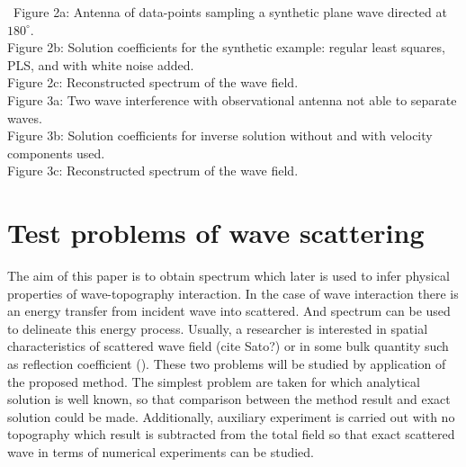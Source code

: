 \
Figure 2a: Antenna of data-points sampling a synthetic plane wave directed at $180^{\circ}$.\\
Figure 2b: Solution coefficients for the synthetic example: regular least squares, PLS, and with 
white noise added.\\
Figure 2c: Reconstructed spectrum of the wave field.\\

Figure 3a: Two wave interference with observational antenna not able to separate waves.\\
Figure 3b: Solution coefficients for inverse solution without and with velocity components used.\\
Figure 3c: Reconstructed spectrum of the wave field.\\

\section{Test problems of wave scattering}
The aim of this paper is to obtain spectrum which later is used to infer physical properties of 
wave-topography interaction. In the case of wave interaction there is an energy transfer from 
incident wave into scattered. And spectrum can be used to delineate this energy process. Usually, a 
researcher is interested in spatial characteristics of scattered wave field (cite Sato?) or in some 
bulk quantity such as reflection coefficient (\cite{klymak2016reflection}). These two problems will 
be studied by application of the proposed method. The simplest problem are taken for which 
analytical solution is well known, so that comparison between the method result and exact solution 
could be made. Additionally, auxiliary experiment is carried out with no topography which result is 
subtracted from the total field so that exact scattered wave in terms of numerical experiments can 
be studied.

